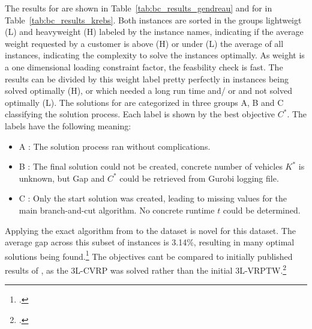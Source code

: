 The results for \gendreauDataSetText are shown in Table~\ref{tab:bc_results_gendreau} and for \krebsADataSetText in Table~\ref{tab:bc_results_krebs}.
Both instances are sorted in the groups lightweigt (L) and heavyweight (H) labeled by the instance names, indicating if the average weight
requested by a customer is above (H) or under (L) the average of all instances, indicating the complexity to solve the instances optimally.
As weight is a one dimensional loading constraint factor, the feasbility check is fast. The results can be divided by this weight label
pretty perfectly in instances being solved optimally (H), or which needed a long run time and/ or and not solved optimally (L).
The solutions for \krebsADataSetText are categorized in three groups A, B and C classifying the solution process. Each label is shown
by the best objective $C^*$. The labels have the following meaning:
\begin{itemize}
    \item A : The solution process ran without complications.
    \item B : The final solution could not be created, concrete number of vehicles $K^*$ is unknown, but Gap and $C^*$ could be retrieved from Gurobi logging file.
    \item C : Only the start solution was created, leading to missing values for the main branch-and-cut algorithm. No concrete runtime $t$ could be determined.
\end{itemize}

Applying the exact algorithm from \cite{tamke_branch-and-cut_2024} to the \krebsADataSetText dataset is novel for this dataset.
The average gap across this subset of instances is 3.14\%, resulting in many optimal solutions being found.\footcite[cf.][]{tamke_branch-and-cut_2024}
The objectives cant be compared to initially published results of \cite{krebs_advanced_2021}, as the \gls{3L-CVRP} was solved rather than the initial \gls{3L-VRPTW}.\footcite[cf.][pp. 858–864]{krebs_advanced_2021}

